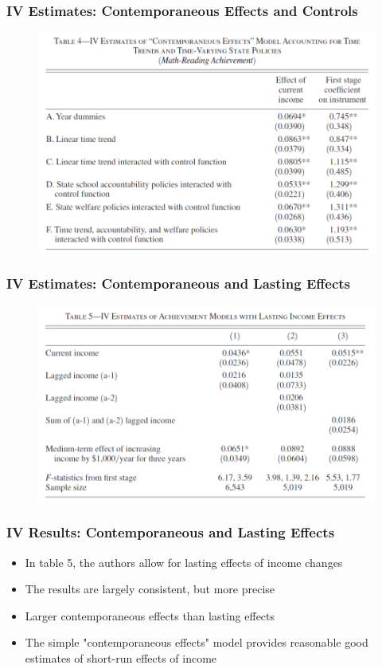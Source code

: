 \documentclass{beamer}
\begin{document}
\begin{frame}
\frametitle{IV Estimates: Contemporaneous Effects and Controls}
\begin{figure}
	\includegraphics[scale=0.3]{../Tables/table3.png} %
\end{figure}
\end{frame}

\begin{frame}
\frametitle{IV Estimates: Contemporaneous and Lasting Effects}
\begin{figure}
	\includegraphics[scale=0.3]{../Tables/table4.png} %
\end{figure}
\end{frame}

\begin{frame}
\frametitle{IV Results: Contemporaneous and Lasting Effects}
\begin{itemize}
	\item In table 5, the authors allow for lasting effects of income changes
	\item The results are largely consistent, but more precise
	\item Larger contemporaneous effects than lasting effects
	\item The simple "contemporaneous effects" model provides reasonable good estimates of short-run effects of income
\end{itemize}
\end{frame}
\end{document}
